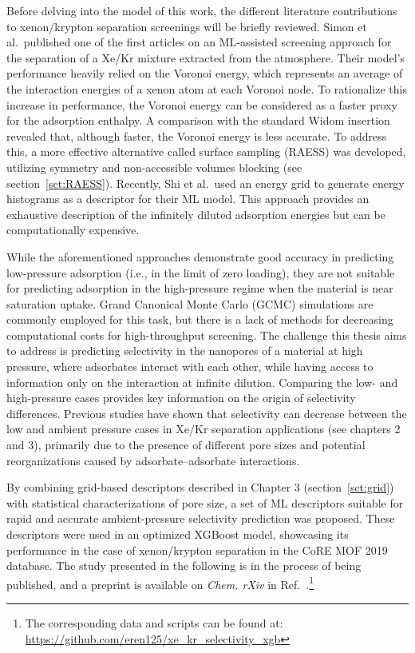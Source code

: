 \documentclass[main]{subfiles}
\begin{document}
Before delving into the model of this work, the different literature contributions to xenon/krypton separation screenings will be briefly reviewed. Simon et al.\ published one of the first articles on an ML-assisted screening approach for the separation of a Xe/Kr mixture extracted from the atmosphere.\autocite{Simon_2015} Their model's performance heavily relied on the Voronoi energy, which represents an average of the interaction energies of a xenon atom at each Voronoi node.\autocite{Rycroft_2009} To rationalize this increase in performance, the Voronoi energy can be considered as a faster proxy for the adsorption enthalpy. A comparison with the standard Widom insertion revealed that, although faster, the Voronoi energy is less accurate. To address this, a more effective alternative called surface sampling (RAESS) was developed, utilizing symmetry and non-accessible volumes blocking (see section~\ref{sct:RAESS}). Recently, Shi et al.\ used an energy grid to generate energy histograms as a descriptor for their ML model. This approach provides an exhaustive description of the infinitely diluted adsorption energies\autocite{Shi_2023} but can be computationally expensive.

While the aforementioned approaches demonstrate good accuracy in predicting low-pressure adsorption (i.e., in the limit of zero loading), they are not suitable for predicting adsorption in the high-pressure regime when the material is near saturation uptake. Grand Canonical Monte Carlo (GCMC) simulations are commonly employed for this task, but there is a lack of methods for decreasing computational costs for high-throughput screening. The challenge this thesis aims to address is predicting selectivity in the nanopores of a material at high pressure, where adsorbates interact with each other, while having access to information only on the interaction at infinite dilution. Comparing the low- and high-pressure cases provides key information on the origin of selectivity differences. Previous studies have shown that selectivity can decrease between the low and ambient pressure cases in Xe/Kr separation applications (see chapters 2 and 3), primarily due to the presence of different pore sizes and potential reorganizations caused by adsorbate--adsorbate interactions.

By combining grid-based descriptors described in Chapter 3 (section~\ref{sct:grid}) with statistical characterizations of pore size, a set of ML descriptors suitable for rapid and accurate ambient-pressure selectivity prediction was proposed. These descriptors were used in an optimized XGBoost model, showcasing its performance in the case of xenon/krypton separation in the CoRE MOF 2019 database\autocite{Chung_2019}. The study presented in the following is in the process of being published, and a preprint is available on \emph{Chem. rXiv} in Ref.~\cite{Ren_2023_ml}.\footnote[1]{The corresponding data and scripts can be found at: \url{https://github.com/eren125/xe_kr_selectivity_xgb} }
\end{document}
